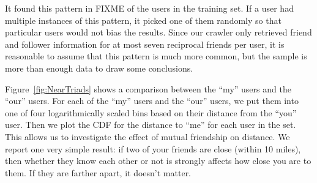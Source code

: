 It found this pattern in FIXME of the users in the training set.
If a user had multiple instances of this pattern, it picked one of them
randomly so that particular users would not bias the results.
Since our crawler only retrieved friend and follower information for at most
seven reciprocal friends per user, it is reasonable to assume that this pattern
is much more common, but the sample is more than enough data to draw some
conclusions.

Figure~\ref{fig:NearTriads} shows a comparison between the ``my'' users and the
``our'' users.
For each of the ``my'' users and the ``our'' users, we put them into one of
four logarithmically scaled bins based on their distance from the ``you'' user.
Then we plot the CDF for the distance to ``me'' for each user in the set. This
allows us to investigate the effect of mutual friendship on distance.
We report one very simple result: if two of your friends are close (within 10
miles), then whether they know each other or not is strongly affects how close
you are to them. If they are farther apart, it doesn't matter.
%
%
%
%
